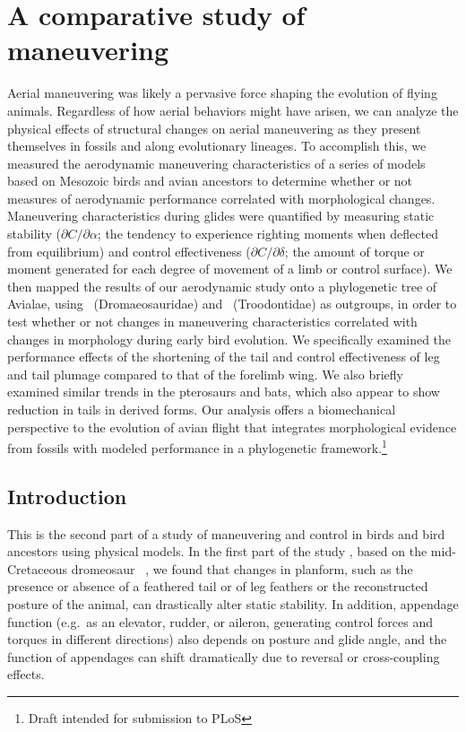 
\chapter{ A comparative study of maneuvering}
\label{ch:3}

Aerial maneuvering was likely a pervasive force shaping the evolution of flying animals. Regardless of how aerial behaviors might have arisen, we can analyze the physical effects of structural changes on aerial maneuvering as they present themselves in fossils and along evolutionary lineages. To accomplish this, we measured the aerodynamic maneuvering characteristics of a series of models based on Mesozoic birds and avian ancestors to determine whether or not measures of aerodynamic performance correlated with morphological changes. Maneuvering characteristics during glides were quantified by measuring static stability ($\partial C/\partial\alpha$; the tendency to experience righting moments when deflected from equilibrium) and control effectiveness ($\partial C/\partial\delta$; the amount of torque or moment generated for each degree of movement of a limb or control surface).  We then mapped the results of our aerodynamic study onto a phylogenetic tree of Avialae, using \Microraptor\ (Dromaeosauridae) and \Anchiornis\ (Troodontidae) as outgroups, in order to test whether or not changes in maneuvering characteristics correlated with changes in morphology during early bird evolution. We specifically examined the performance effects of the shortening of the tail and control effectiveness of leg and tail plumage compared to that of the forelimb wing.  We also briefly examined similar trends in the pterosaurs and bats, which also appear to show reduction in tails in derived forms. Our analysis offers a biomechanical perspective to the evolution of avian flight that integrates morphological evidence from fossils with modeled performance in a phylogenetic framework.\footnote{Draft intended for submission to PLoS}



\section{Introduction}
This is the second part of a study of maneuvering and control in birds and bird ancestors using physical models.  In the first part of the study \cite{plos:part1}, based on the mid-Cretaceous dromeosaur \Microraptorgui\ \cite{Xu:2003}, we found that changes in planform, such as the presence or absence of a feathered tail or of leg feathers or the reconstructed posture of the animal, can drastically alter static stability. In addition, appendage function (e.g.\ as an elevator, rudder, or aileron, generating control forces and torques in different directions) also depends on posture and glide angle, and the function of appendages can shift dramatically due to reversal or cross-coupling effects.

